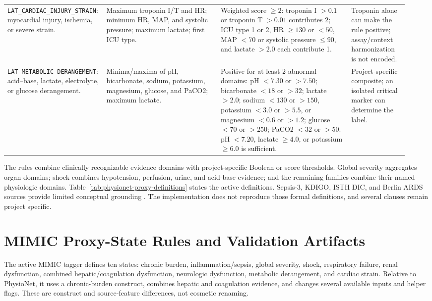 \begin{landscape}
\begin{longtable}{@{}L{0.19\linewidth}L{0.29\linewidth}L{0.32\linewidth}L{0.14\linewidth}@{}}
\nolinkurl{LAT_CARDIAC_INJURY_STRAIN}: myocardial injury, ischemia, or severe strain. & Maximum troponin I/T and HR; minimum HR, MAP, and systolic pressure; maximum lactate; first ICU type. & Weighted score $\ge 2$: troponin I $>0.1$ or troponin T $>0.01$ contributes 2; ICU type 1 or 2, HR $\ge 130$ or $<50$, MAP $<70$ or systolic pressure $\le 90$, and lactate $>2.0$ each contribute 1. & Troponin alone can make the rule positive; assay/context harmonization is not encoded. \\
\nolinkurl{LAT_METABOLIC_DERANGEMENT}: acid--base, lactate, electrolyte, or glucose derangement. & Minima/maxima of pH, bicarbonate, sodium, potassium, magnesium, glucose, and PaCO2; maximum lactate. & Positive for at least 2 abnormal domains: pH $<7.30$ or $>7.50$; bicarbonate $<18$ or $>32$; lactate $>2.0$; sodium $<130$ or $>150$, potassium $<3.0$ or $>5.5$, or magnesium $<0.6$ or $>1.2$; glucose $<70$ or $>250$; PaCO2 $<32$ or $>50$.  pH $<7.20$, lactate $\ge 4.0$, or potassium $\ge 6.0$ is sufficient. & Project-specific composite; an isolated critical marker can determine the label. \\
\end{longtable}
\endgroup
\end{landscape}

The rules combine clinically recognizable evidence domains with project-specific Boolean or score thresholds.  Global severity aggregates organ domains; shock combines hypotension, perfusion, urine, and acid-base evidence; and the remaining families combine their named physiologic domains.  Table~\ref{tab:physionet-proxy-definitions} states the active definitions.  Sepsis-3, KDIGO, ISTH DIC, and Berlin ARDS sources provide limited conceptual grounding \cite{singer_2016_sepsis3,kdigo_2012_acute_kidney_injury,taylor_et_al_2001_isth_dic,ranieri_et_al_2012_berlin_ards}.  The implementation does not reproduce those formal definitions, and several clauses remain project specific.

\section{MIMIC Proxy-State Rules and Validation Artifacts}
\label{sec:clinical-proxy-state-construction:mimic-proxy-state-rules-validation-artifacts}

The active MIMIC tagger defines ten states: chronic burden, inflammation/sepsis, global severity, shock, respiratory failure, renal dysfunction, combined hepatic/coagulation dysfunction, neurologic dysfunction, metabolic derangement, and cardiac strain.  Relative to PhysioNet, it uses a chronic-burden construct, combines hepatic and coagulation evidence, and changes several available inputs and helper flags.  These are construct and source-feature differences, not cosmetic renaming.


